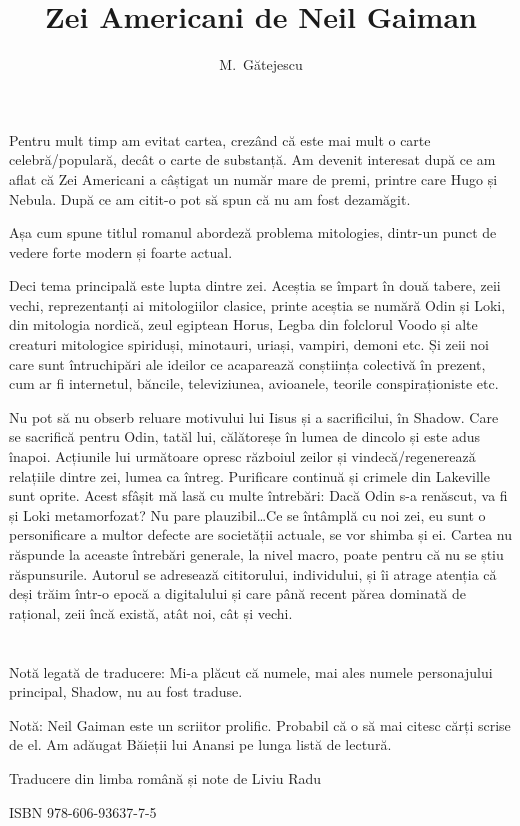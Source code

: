 \documentclass[11pt]{article}
\author{M.~Gătejescu}
\title{Zei Americani de Neil Gaiman}
\begin{document}
\maketitle

Pentru mult timp am evitat cartea, crezând că este mai mult o carte
celebră\slash populară, decât o carte de substanță. Am devenit
interesat după ce am aflat că Zei Americani a câștigat un număr
mare de premi, printre care Hugo și Nebula. După ce am citit-o
pot să spun că nu am fost dezamăgit.

Așa cum spune titlul romanul abordeză problema mitologies, dintr-un
punct de vedere forte modern și foarte actual.

Deci tema principală este lupta dintre zei. Aceștia se împart în
două tabere, zeii vechi, reprezentanți ai mitologiilor clasice,
printe aceștia se numără Odin și Loki, din mitologia nordică, zeul
egiptean Horus, Legba din folclorul Voodo și alte creaturi mitologice
spiriduși, minotauri, uriași, vampiri, demoni etc. Și zeii noi care
sunt întruchipări ale ideilor ce acaparează conștiința colectivă
în prezent, cum ar fi internetul, băncile, televiziunea, avioanele,
teorile conspiraționiste etc.

Nu pot să nu obserb reluare motivului lui Iisus și a sacrificilui,
în Shadow. Care se sacrifică pentru Odin, tatăl lui, călătoreșe în
lumea de dincolo și este adus înapoi. Acțiunile lui următoare opresc
războiul zeilor și vindecă\slash regenerează relațiile dintre zei,
lumea ca întreg. Purificare continuă și crimele din Lakeville sunt
oprite.
Acest sfâșit mă lasă cu multe întrebări: Dacă Odin s-a renăscut,
va fi și Loki metamorfozat? Nu pare plauzibil\ldots Ce se întâmplă
cu noi zei, eu sunt o personificare a multor defecte are societății
actuale, se vor shimba și ei.
Cartea nu răspunde la aceaste întrebări generale, la nivel macro,
poate pentru că nu se știu răspunsurile. Autorul se adresează
cititorului, individului, și îi atrage atenția că deși trăim
într-o epocă a digitalului și care până recent părea dominată
de rațional, zeii încă există, atât noi, cât și vechi.

\section*{}
Notă legată de traducere: Mi-a plăcut că numele, mai ales numele
personajului principal, Shadow, nu au fost traduse.

Notă: Neil Gaiman este un scriitor prolific. Probabil că o să mai
citesc cărți scrise de el. Am adăugat Băieții lui Anansi pe lunga
listă de lectură.

Traducere din limba română și note de Liviu Radu

ISBN 978-606-93637-7-5
\end{document}
